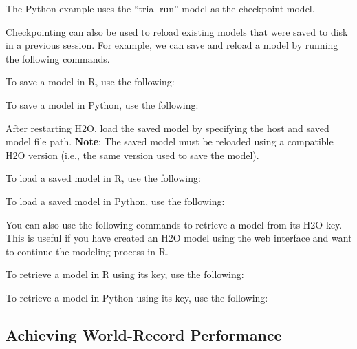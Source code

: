 {{The Python example uses the ``trial run'' model  as the checkpoint model.

\waterExampleInPython


\noindent
Checkpointing can also be used to reload existing models that were saved to disk in a previous session. For example, we can save and reload a model by running the following commands.


To save a model in R, use the following: 

\waterExampleInR



To save a model in Python, use the following: 

\waterExampleInPython


\noindent
After restarting  H2O, load the saved model by specifying the host and saved model file path. \textbf{Note}: The saved model must be reloaded using a compatible H2O version (i.e., the same version used to save the model).

\newpage
To load a saved model in R, use the following: 

\waterExampleInR


To load a saved model in Python, use the following: 

\waterExampleInPython



\noindent
You can also use the following commands to retrieve a model from its H2O key. This is useful if you have created an H2O model using the web interface and want to continue the modeling process in R.

To retrieve a model in R using its key, use the following: 

\waterExampleInR


To retrieve a model in Python using its key, use the following: 

\waterExampleInPython


\subsection{Achieving World-Record Performance}

}}
